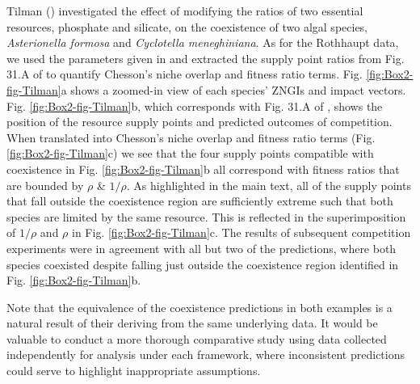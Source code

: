 \begin{tcolorbox}[breakable, leftright skip=-0.5cm]
Tilman (\citeyear{Tilman1977, tilman1982}) investigated the effect of modifying the ratios of two essential resources, phosphate and silicate, on the coexistence of two algal species, \textit{Asterionella formosa} and \textit{Cyclotella meneghiniana}. As for the Rothhaupt data, we used the parameters given in \cite{Tilman1977} and extracted the supply point ratios from Fig. 31.A of \citet{tilman1982} to quantify Chesson's niche overlap and fitness ratio terms. Fig. \ref{fig:Box2-fig-Tilman}a shows a zoomed-in view of each species' ZNGIs and impact vectors. Fig. \ref{fig:Box2-fig-Tilman}b, which corresponds with Fig. 31.A of \citet{tilman1982}, shows the position of the resource supply points and predicted outcomes of competition. When translated into Chesson's niche overlap and fitness ratio terms (Fig. \ref{fig:Box2-fig-Tilman}c) we see that the four supply points compatible with coexistence in Fig. \ref{fig:Box2-fig-Tilman}b all correspond with fitness ratios that are bounded by $\rho$ \& $1/\rho$. As highlighted in the main text, all of the supply points that fall outside the coexistence region are sufficiently extreme such that both species are limited by the same resource. This is reflected in the superimposition of $1/\rho$ and $\rho$ in Fig. \ref{fig:Box2-fig-Tilman}c. The results of subsequent competition experiments were in agreement with all but two of the predictions, where both species coexisted despite falling just outside the coexistence region identified in Fig. \ref{fig:Box2-fig-Tilman}b.
\par


Note that the equivalence of the coexistence predictions in both examples is a natural result of their deriving from the same underlying data. It would be valuable to conduct a more thorough comparative study using data collected independently for analysis under each framework, where inconsistent predictions could serve to highlight inappropriate assumptions.
\end{tcolorbox}
